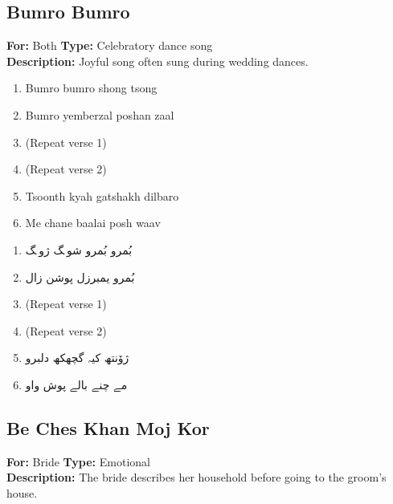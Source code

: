 \documentclass[12pt]{article}
\newcommand{\bigroman}[1]{\fontsize{16pt}{18pt}\selectfont\RaggedRight #1}
\newcommand{\bigarabic}[1]{\fontsize{16pt}{18pt}\selectfont \textarabic{#1}}
\begin{document}
\subsection*{Bumro Bumro}
\textbf{For:} Both \quad \textbf{Type:} Celebratory dance song\\
\textbf{Description:} Joyful song often sung during wedding dances.

\begin{multicols}{2}
  \begin{enumerate}[leftmargin=*, label=\arabic*., font=\fontsize{16pt}{18pt}\selectfont]
    \item \bigroman{Bumro bumro shong tsong}
    \item \bigroman{Bumro yemberzal poshan zaal}
    \item \bigroman{(Repeat verse 1)}
    \item \bigroman{(Repeat verse 2)}
    \item \bigroman{Tsoonth kyah gatshakh dilbaro}
    \item \bigroman{Me chane baalai posh waav}
  \end{enumerate}
  
  \columnbreak
  
  \begin{RTL}
  \begin{enumerate}[leftmargin=*, label=\arabic*., font=\fontsize{16pt}{18pt}\selectfont]
    \item \bigarabic{بُمرو بُمرو شونٛگ ژونٛگ}
    \item \bigarabic{بُمرو یمبرزل پوشن زال}
    \item \bigarabic{(Repeat verse 1)}
    \item \bigarabic{(Repeat verse 2)}
    \item \bigarabic{ژۆنتھ کیہ گچھکھ دلبرو}
    \item \bigarabic{مے چنے بالے پوش واو}
  \end{enumerate}
  \end{RTL}
  \end{multicols}




  \subsection*{Be Ches Khan Moj Kor}
  \textbf{For:} Bride \quad \textbf{Type:} Emotional\\
  \textbf{Description:} The bride describes her household before going to the groom's house.
  
\end{document}
